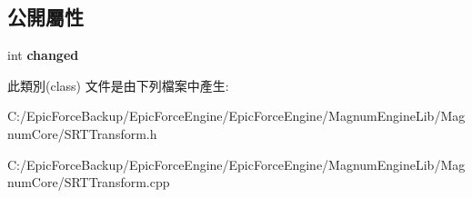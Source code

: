 \subsection*{公開屬性}
\begin{DoxyCompactItemize}
\item 
int {\bfseries changed}\hypertarget{class_magnum_1_1_s_r_t_transform_a147aec82d81bac718de8f65488a4e354}{}\label{class_magnum_1_1_s_r_t_transform_a147aec82d81bac718de8f65488a4e354}

\end{DoxyCompactItemize}


此類別(class) 文件是由下列檔案中產生\+:\begin{DoxyCompactItemize}
\item 
C\+:/\+Epic\+Force\+Backup/\+Epic\+Force\+Engine/\+Epic\+Force\+Engine/\+Magnum\+Engine\+Lib/\+Magnum\+Core/S\+R\+T\+Transform.\+h\item 
C\+:/\+Epic\+Force\+Backup/\+Epic\+Force\+Engine/\+Epic\+Force\+Engine/\+Magnum\+Engine\+Lib/\+Magnum\+Core/S\+R\+T\+Transform.\+cpp\end{DoxyCompactItemize}
